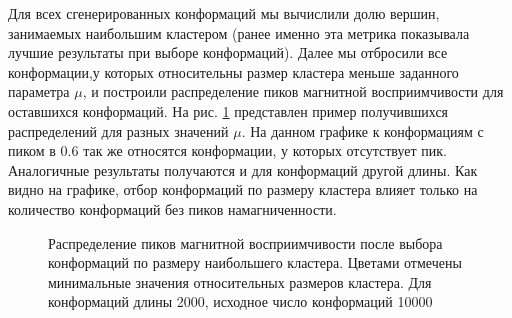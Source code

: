 Для всех сгенерированных конформаций мы вычислили долю вершин, занимаемых наибольшим кластером (ранее именно эта метрика показывала лучшие результаты при выборе конформаций). Далее мы отбросили все конформации,у которых относительны размер кластера меньше заданного параметра $\mu$, и построили распределение пиков магнитной восприимчивости для оставшихся конформаций. На рис. \ref{fig:peaks_chosen_by_cluster} представлен пример получившихся распределений для разных значений $\mu$. На данном графике к конформациям с пиком в 0.6 так же относятся конформации, у которых отсутствует пик. Аналогичные результаты получаются и для конформаций другой длины. Как видно на графике, отбор конформаций по размеру кластера влияет только на количество конформаций без пиков намагниченности.

\begin{figure}
	\centering
	
	\caption{Распределение пиков магнитной восприимчивости после выбора конформаций по размеру наибольшего кластера. Цветами отмечены минимальные значения относительных размеров кластера. Для конформаций длины 2000, исходное число конформаций 10000}
	\label{fig:peaks_chosen_by_cluster}

\end{figure}